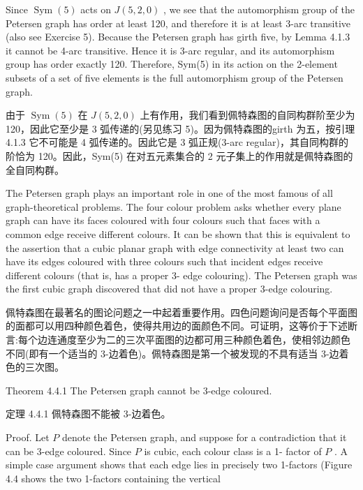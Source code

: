 \documentclass[10pt]{article}
\begin{document}
Since \(\operatorname{Sym}\left( 5\right)\) acts on \(J\left( {5,2,0}\right)\) , we see that the automorphism group of the Petersen graph has order at least 120, and therefore it is at least 3-arc transitive (also see Exercise 5). Because the Petersen graph has girth five, by Lemma 4.1.3 it cannot be 4-arc transitive. Hence it is 3-arc regular, and its automorphism group has order exactly 120. Therefore, Sym(5) in its action on the 2-element subsets of a set of five elements is the full automorphism group of the Petersen graph.

\begin{tcolorbox}\relax
由于 \(\operatorname{Sym}\left( 5\right)\) 在 \(J\left( {5,2,0}\right)\) 上有作用，我们看到佩特森图的自同构群阶至少为 120，因此它至少是 3 弧传递的(另见练习 5)。因为佩特森图的girth 为五，按引理 4.1.3 它不可能是 4 弧传递的。因此它是 3 弧正规(3-arc regular)，其自同构群的阶恰为 120。因此，Sym(5) 在对五元素集合的 2 元子集上的作用就是佩特森图的全自同构群。
\end{tcolorbox}

The Petersen graph plays an important role in one of the most famous of all graph-theoretical problems. The four colour problem asks whether every plane graph can have its faces coloured with four colours such that faces with a common edge receive different colours. It can be shown that this is equivalent to the assertion that a cubic planar graph with edge connectivity at least two can have its edges coloured with three colours such that incident edges receive different colours (that is, has a proper 3- edge colouring). The Petersen graph was the first cubic graph discovered that did not have a proper 3-edge colouring.

\begin{tcolorbox}\relax
佩特森图在最著名的图论问题之一中起着重要作用。四色问题询问是否每个平面图的面都可以用四种颜色着色，使得共用边的面颜色不同。可证明，这等价于下述断言:每个边连通度至少为二的三次平面图的边都可用三种颜色着色，使相邻边颜色不同(即有一个适当的 3-边着色)。佩特森图是第一个被发现的不具有适当 3-边着色的三次图。
\end{tcolorbox}

Theorem 4.4.1 The Petersen graph cannot be 3-edge coloured.

\begin{tcolorbox}\relax
定理 4.4.1 佩特森图不能被 3-边着色。
\end{tcolorbox}

Proof. Let \(P\) denote the Petersen graph, and suppose for a contradiction that it can be 3-edge coloured. Since \(P\) is cubic, each colour class is a 1- factor of \(P\) . A simple case argument shows that each edge lies in precisely two 1-factors (Figure 4.4 shows the two 1-factors containing the vertical
\end{document}
